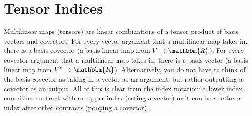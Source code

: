 \documentclass[
  11pt,
	colorful,
	raggedright,
]{tufte-style-thesis-flip}
\begin{document}
\section{Tensor Indices}
\label{sec:indices:II}



Multilinear maps (tensors) are linear combinations of a tensor product of basis vectors and covectors. For every vector argument that a multilinear map takes in, there is a basis covector (a basis linear map from $V\to \mathbbm{R}$). For every covector argument that a multilinear map takes in, there is a basis vector (a basis linear map from $V^*\to \mathbbm{R}$). Alternatively, you do not have to think of the basis covector as taking in a vector as an argument, but rather outputting a covector as an output. All of this is clear from the index notation: a lower index can either contract with an upper index (eating a vector) or it can be a leftover index after other contracts (pooping a covector). 
\end{document}
